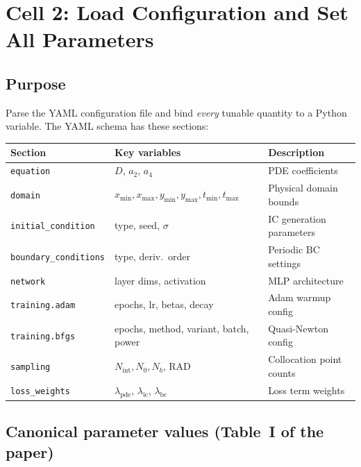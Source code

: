 \documentclass[11pt,a4paper]{article}
\begin{document}
\section{Cell 2: Load Configuration and Set All Parameters}
\label{sec:config}

\subsection*{Purpose}

Parse the YAML configuration file and bind \emph{every} tunable
quantity to a Python variable.  The YAML schema has these sections:

\begin{center}
\renewcommand{\arraystretch}{1.3}
\begin{tabular}{@{}llp{7cm}@{}}
\toprule
\textbf{Section} & \textbf{Key variables} & \textbf{Description} \\
\midrule
\texttt{equation}   & $D$, $a_2$, $a_4$             & PDE coefficients \\
\texttt{domain}     & $x_{\min},x_{\max},y_{\min},y_{\max},t_{\min},t_{\max}$ & Physical domain bounds \\
\texttt{initial\_condition} & type, seed, $\sigma$   & IC generation parameters \\
\texttt{boundary\_conditions} & type, deriv.\ order  & Periodic BC settings \\
\texttt{network}    & layer dims, activation         & MLP architecture \\
\texttt{training.adam}  & epochs, lr, betas, decay   & Adam warmup config \\
\texttt{training.bfgs}  & epochs, method, variant, batch, power & Quasi-Newton config \\
\texttt{sampling}   & $N_{\mathrm{int}}, N_0, N_b$, RAD & Collocation point counts \\
\texttt{loss\_weights} & $\lambda_{\mathrm{pde}}$, $\lambda_{\mathrm{ic}}$, $\lambda_{\mathrm{bc}}$ & Loss term weights \\
\bottomrule
\end{tabular}
\end{center}

\subsection*{Canonical parameter values (Table~I of the paper)}
\end{document}
